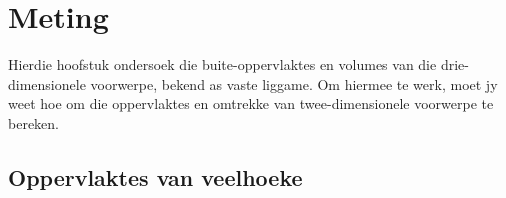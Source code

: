 \chapter{Meting }  
Hierdie hoofstuk ondersoek die buite-oppervlaktes en volumes van die drie-dimensionele voorwerpe, bekend as vaste liggame. Om hiermee te werk, moet jy weet hoe om die oppervlaktes en omtrekke van twee-dimensionele voorwerpe te bereken.
\par


\section{Oppervlaktes van veelhoeke}

